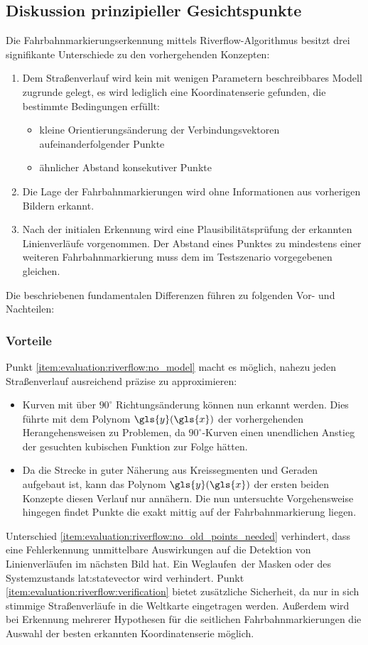 \subsection{Diskussion prinzipieller Gesichtspunkte} 
Die Fahrbahnmarkierungserkennung mittels Riverflow-Algorithmus besitzt drei signifikante Unterschiede zu den vorhergehenden Konzepten:
\begin{enumerate}
\item \label{item:evaluation:riverflow:no_model}
Dem Straßenverlauf wird kein mit wenigen Parametern beschreibbares Modell zugrunde gelegt, es wird lediglich eine Koordinatenserie gefunden, die bestimmte Bedingungen erfüllt:
\begin{itemize}
\item kleine Orientierungsänderung der Verbindungsvektoren aufeinanderfolgender Punkte
\item ähnlicher Abstand konsekutiver Punkte
\end{itemize}
\item \label{item:evaluation:riverflow:no_old_points_needed}
Die Lage der Fahrbahnmarkierungen wird ohne Informationen aus vorherigen Bildern erkannt.
\item \label{item:evaluation:riverflow:verification}
Nach der initialen Erkennung wird eine Plausibilitätsprüfung der erkannten Linienverläufe vorgenommen. Der Abstand eines Punktes zu mindestens einer weiteren Fahrbahnmarkierung muss dem im Testszenario vorgegebenen gleichen. 
\end{enumerate}
Die beschriebenen fundamentalen Differenzen führen zu folgenden Vor- und Nachteilen:

\subsubsection{Vorteile}
Punkt \ref{item:evaluation:riverflow:no_model} macht es möglich, nahezu jeden Straßenverlauf ausreichend präzise zu approximieren:
\begin{itemize} 
\item
Kurven mit über \(90^{\circ}\) Richtungsänderung können nun erkannt werden. Dies führte mit dem Polynom \(\gls{y}(\gls{x})\) der vorhergehenden Herangehensweisen zu Problemen, da \(90^{\circ}\)-Kurven einen unendlichen Anstieg der gesuchten kubischen Funktion zur Folge hätten.
\item
Da die Strecke in guter Näherung aus Kreissegmenten und Geraden aufgebaut ist, kann das  Polynom \(\gls{y}(\gls{x})\) der ersten beiden Konzepte diesen Verlauf nur annähern. Die nun untersuchte Vorgehensweise hingegen findet Punkte die exakt mittig auf der Fahrbahnmarkierung liegen.
\end{itemize}
Unterschied \ref{item:evaluation:riverflow:no_old_points_needed} verhindert, dass eine Fehlerkennung unmittelbare Auswirkungen auf die Detektion von Linienverläufen im nächsten Bild hat. Ein \glqq Weglaufen\grqq\ der Masken oder des Systemzustands \gls{lat:statevector} wird verhindert.
Punkt \ref{item:evaluation:riverflow:verification} bietet zusätzliche Sicherheit, da nur in sich stimmige Straßenverläufe in die Weltkarte eingetragen werden. Außerdem wird bei Erkennung mehrerer Hypothesen für die seitlichen Fahrbahnmarkierungen die Auswahl der besten erkannten Koordinatenserie möglich.

